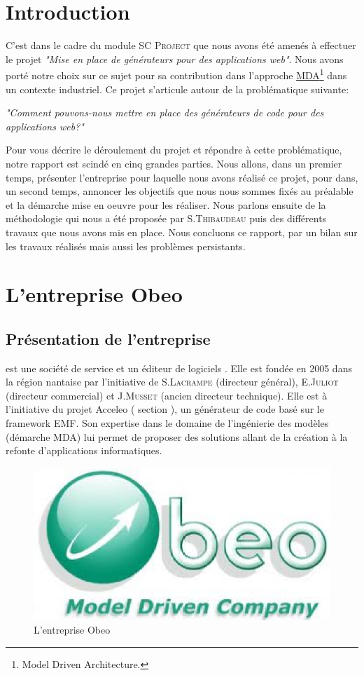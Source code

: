 \chapter*{Introduction}\label{chap:Intro}
C'est dans le cadre du module \textsc{SC Project} que nous avons été amenés à effectuer le projet \textit{"Mise en place de générateurs pour des applications web"}. Nous avons porté notre choix sur ce sujet pour sa contribution dans l'approche \href{http://fr.wikipedia.org/wiki/Model_driven_architecture}{MDA}\footnote{Model Driven Architecture.} dans un contexte industriel. 
Ce projet s'articule autour de la problématique suivante:
\begin {center}
\textit{"Comment pouvons-nous mettre en place des générateurs de code pour des applications web?"}
\end{center}
Pour vous décrire le déroulement du projet et répondre à cette problématique, notre rapport est scindé en cinq grandes parties. Nous allons, dans un premier temps, présenter l'entreprise \kwobeo{} pour laquelle nous avons réalisé ce projet, pour dans, un second temps, annoncer les objectifs que nous nous sommes fixés au préalable et la démarche mise en oeuvre pour les réaliser. Nous parlons ensuite de la méthodologie qui nous a été proposée par S.\textsc{Thibaudeau} puis des différents travaux que nous avons mis en place. Nous concluons ce rapport, par un bilan sur les travaux réalisés mais aussi les problèmes persistants.


\chapter{L'entreprise Obeo}
\section{Présentation de l'entreprise}
\kwobeo{} est une société de service et un éditeur de logiciels \cite{obeo}.  Elle est fondée en 2005 dans la région nantaise par l'initiative de S.\textsc{Lacrampe} (directeur général), E.\textsc{Juliot} (directeur commercial) et J.\textsc{Musset} (ancien directeur technique). Elle est à l'initiative du projet Acceleo (\cf{} section \cite{acceleo}), un générateur de code basé sur le framework EMF. Son expertise dans le domaine de l'ingénierie des modèles (démarche MDA) lui permet de proposer des solutions allant de la création à la refonte d'applications informatiques. 
\begin{figure}[htb]
  \centering
  \includegraphics[scale=.4]{img/logoobeo.eps}
  \caption{L'entreprise Obeo}
\end{figure}

